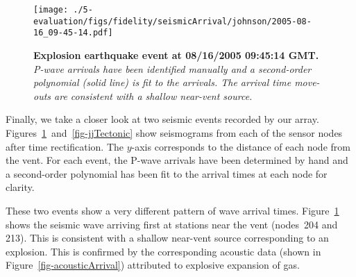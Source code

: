 %

\begin{figure}[t]
\begin{center}
\texttt{[image: ./5-evaluation/figs/fidelity/seismicArrival/johnson/2005-08-16\_09-45-14.pdf]}
\end{center}
\caption{\small{\bf Explosion earthquake event at 08/16/2005 09:45:14 GMT.}
{\em P-wave arrivals have been identified manually and a second-order
polynomial (solid line) is fit to the arrivals. The arrival time
move-outs are consistent with a shallow near-vent source.}}
\label{fig-jjExplosion}
\end{figure}


Finally, we take a closer look at two seismic events recorded by our
array.  Figures~\ref{fig-jjExplosion}~and~\ref{fig-jjTectonic} show
seismograms from each of the sensor nodes after time rectification.
The $y$-axis corresponds to the distance of each node from the vent.
For each event, the P-wave arrivals have been determined by hand and a
second-order polynomial has been fit to the arrival times at each node
for clarity.

These two events show a very different pattern of wave arrival
times. Figure~\ref{fig-jjExplosion} shows the seismic wave
arriving first at stations near the vent (nodes~204 and 213). This
is consistent with a shallow near-vent source corresponding to an
explosion. This is confirmed by the corresponding acoustic data (shown
in Figure~\ref{fig-acousticArrival}) attributed to explosive expansion
of gas. 

